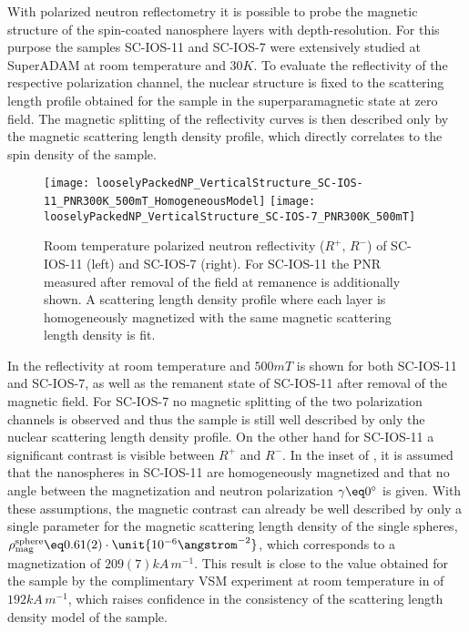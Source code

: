 \documentclass[\main/dresen_thesis.tex]{subfiles}
\begin{document}
  \label{sec:looselyPackedNS:layers:pnr}
  With polarized neutron reflectometry it is possible to probe the magnetic structure of the spin-coated nanosphere layers with depth-resolution.
  For this purpose the samples SC-IOS-11 and SC-IOS-7 were extensively studied at SuperADAM at room temperature and $30 \unit{K}$.
  To evaluate the reflectivity of the respective polarization channel, the nuclear structure is fixed to the scattering length profile obtained for the sample in the superparamagnetic state at zero field.
  The magnetic splitting of the reflectivity curves is then described only by the magnetic scattering length density profile, which directly correlates to the spin density of the sample.

  \begin{figure}[tb]
    \centering
    \texttt{[image: looselyPackedNP\_VerticalStructure\_SC-IOS-11\_PNR300K\_500mT\_HomogeneousModel]}
    \texttt{[image: looselyPackedNP\_VerticalStructure\_SC-IOS-7\_PNR300K\_500mT]}
    \caption{\label{fig:looselyPackedNP:layer:pnrRoomTemperatureMagneticHomModel}Room temperature polarized neutron reflectivity ($R^{+},\, R^{-}$) of SC-IOS-11 (left) and SC-IOS-7 (right). For SC-IOS-11 the PNR measured after removal of the field at remanence is additionally shown. A scattering length density profile where each layer is homogeneously magnetized with the same magnetic scattering length density is fit.}
  \end{figure}
  In  the reflectivity at room temperature and $500 \unit{mT}$ is shown for both SC-IOS-11 and SC-IOS-7, as well as the remanent state of SC-IOS-11 after removal of the magnetic field.
  For SC-IOS-7 no magnetic splitting of the two polarization channels is observed and thus the sample is still well described by only the nuclear scattering length density profile.
  On the other hand for SC-IOS-11 a significant contrast is visible between $R^{+}$ and $R^{-}$.
  In the inset of , it is assumed that the nanospheres in SC-IOS-11 are homogeneously magnetized and that no angle between the magnetization and neutron polarization $\gamma \eq 0 ^\circ$ is given.
  With these assumptions, the magnetic contrast can already be well described by only a single parameter for the magnetic scattering length density of the single spheres, $\rho_\mathrm{mag}^\mathrm{sphere} \eq 0.61(2) \cdot \unit{10^{-6} \angstrom^{-2}}$, which corresponds to a magnetization of $209(7) \unit{kA \, m^{-1}}$.
  This result is close to the value obtained for the sample by the complimentary VSM experiment at room temperature in  of $192 \unit{kA \,m^{-1}}$, which raises confidence in the consistency of the scattering length density model of the sample.
\end{document}
